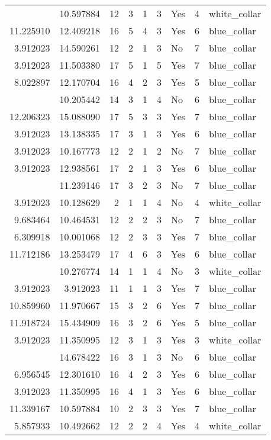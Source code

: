 \documentclass[
]{article}
\begin{document}
\begin{longtable}[t]{rrrrrllrl}
\addlinespace
3.912023 & 10.597884 & 12 & 3 & 1 & 3 & Yes & 4 & white\_collar\\
11.225910 & 12.409218 & 16 & 5 & 4 & 3 & Yes & 6 & blue\_collar\\
3.912023 & 14.590261 & 12 & 2 & 1 & 3 & No & 7 & blue\_collar\\
3.912023 & 11.503380 & 17 & 5 & 1 & 5 & Yes & 7 & blue\_collar\\
8.022897 & 12.170704 & 16 & 4 & 2 & 3 & Yes & 5 & blue\_collar\\
\addlinespace
3.912023 & 10.205442 & 14 & 3 & 1 & 4 & No & 6 & blue\_collar\\
12.206323 & 15.088090 & 17 & 5 & 3 & 3 & Yes & 7 & blue\_collar\\
3.912023 & 13.138335 & 17 & 3 & 1 & 3 & Yes & 6 & blue\_collar\\
3.912023 & 10.167773 & 12 & 2 & 1 & 2 & No & 7 & blue\_collar\\
3.912023 & 12.938561 & 17 & 2 & 1 & 3 & Yes & 6 & blue\_collar\\
\addlinespace
9.905984 & 11.239146 & 17 & 3 & 2 & 3 & No & 7 & blue\_collar\\
3.912023 & 10.128629 & 2 & 1 & 1 & 4 & No & 4 & white\_collar\\
9.683464 & 10.464531 & 12 & 2 & 2 & 3 & No & 7 & blue\_collar\\
6.309918 & 10.001068 & 12 & 2 & 3 & 3 & Yes & 7 & blue\_collar\\
11.712186 & 13.253479 & 17 & 4 & 6 & 3 & Yes & 6 & blue\_collar\\
\addlinespace
3.912023 & 10.276774 & 14 & 1 & 1 & 4 & No & 3 & white\_collar\\
3.912023 & 3.912023 & 11 & 1 & 1 & 3 & Yes & 7 & blue\_collar\\
10.859960 & 11.970667 & 15 & 3 & 2 & 6 & Yes & 7 & blue\_collar\\
11.918724 & 15.434909 & 16 & 3 & 2 & 6 & Yes & 5 & blue\_collar\\
3.912023 & 11.350995 & 12 & 3 & 1 & 3 & Yes & 3 & white\_collar\\
\addlinespace
3.912023 & 14.678422 & 16 & 3 & 1 & 3 & No & 6 & blue\_collar\\
6.956545 & 12.301610 & 16 & 4 & 2 & 3 & Yes & 6 & blue\_collar\\
3.912023 & 11.350995 & 16 & 4 & 1 & 3 & Yes & 6 & blue\_collar\\
11.339167 & 10.597884 & 10 & 2 & 3 & 3 & Yes & 7 & blue\_collar\\
5.857933 & 10.492662 & 12 & 2 & 2 & 4 & Yes & 4 & white\_collar\\

\end{longtable}
\end{document}
